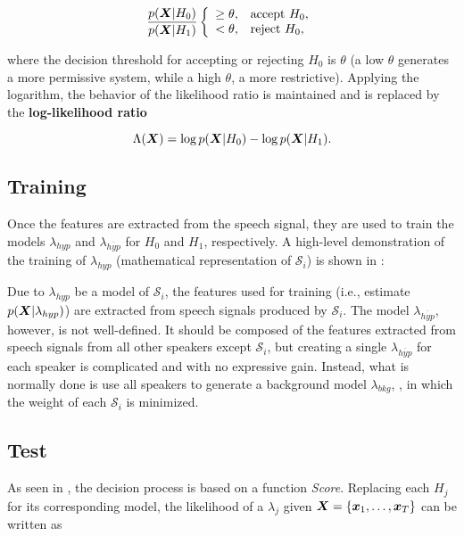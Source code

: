 \begin{equation}
    \frac{\postpdf{\dvec{X}}{H_0}}{\postpdf{\dvec{X}}{H_1}} \verifytestB{\theta}{H_0}
    \label{eq:likelihood-ratio-test}
\end{equation}

\noindent where the decision threshold for accepting or rejecting $H_0$ is $\theta$ (a low $\theta$ generates a more permissive system, while a high $\theta$, a more restrictive). Applying the logarithm, the behavior of the likelihood ratio is maintained and  is replaced by the \textbf{log-likelihood ratio}

\begin{equation}
    \Lambda(\dvec{X}) = \log \postpdf{\dvec{X}}{H_0} - \log \postpdf{\dvec{X}}{H_1}.
    \label{eq:log-likelihood-ratio-test}
\end{equation}

\subsection{Training}

Once the features are extracted from the speech signal, they are used to train the models $\lambda_{hyp}$ and $\lambda_{\overline{hyp}}$ for $H_0$ and $H_1$, respectively. A high-level demonstration of the training of $\lambda_{hyp}$ (mathematical representation of $\mathcal{S}_i$) is shown in :

Due to $\lambda_{hyp}$ be a model of $\mathcal{S}_i$, the features used for training (i.e., estimate $p(\boldsymbol{X}|\lambda_{hyp})$) are extracted from speech signals produced by $\mathcal{S}_i$. The model $\lambda_{\overline{hyp}}$, however, is not well-defined. It should be composed of the features extracted from speech signals from all other speakers except $\mathcal{S}_i$, but creating a single $\lambda_{\overline{hyp}}$ for each speaker is complicated and with no expressive gain. Instead, what is normally done is use all speakers to generate a background model $\lambda_{bkg}$, , in which the weight of each $\mathcal{S}_i$ is minimized.

\subsection{Test}

As seen in , the decision process is based on a function \emph{Score}. Replacing each $H_j$ for its corresponding model, the likelihood of a $\lambda_j$ given $\boldsymbol{X} = \{\boldsymbol{x}_1, \dots, \boldsymbol{x}_T\}$ can be written as

